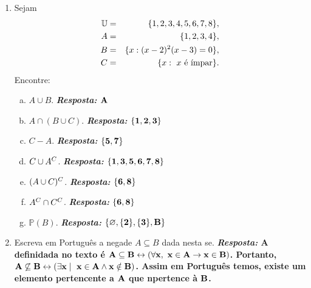 \begin{enumerate}[{\bf 1.}]
\item Sejam
\begin{eqnarray*}
\mathbb{U}&=&\{1,2,3,4,5,6,7,8\},\\
A&=&\{1,2,3,4\},\\
B&=&\{x:(x-2)^2(x-3)=0\},\\
C&=&\{x:\espaco x \textrm{ \'e \ih mpar}\}.
\end{eqnarray*}
Encontre:
\begin{enumerate}[a)]
\item $A\cup B$. {\bf{\it Resposta:} ${\bf A}$}
\item $A\cap(B\cup C)$. {\bf{\it Resposta:} ${\bf \{1,2,3\}}$}
\item $C-A$. {\bf{\it Resposta:} ${\bf \{5,7\}}$}
\item $C\cup A^C$. {\bf{\it Resposta:} ${\bf \{1,3,5,6,7,8\}}$}
\item $(A\cup C)^C$. {\bf{\it Resposta:} ${\bf \{6,8\}}$}
\item $A^C\cap C^C$. {\bf{\it Resposta:} ${\bf \{6,8\}}$}
\item $\mathbb{P}(B)$. {\bf{\it Resposta:} ${\bf \{\varnothing,\{2\},\{3\},B\}}$}
\end{enumerate}

\item Escreva em Portugu\^es a nega\cao de $A\subseteq B$ dada nesta se\caoi.
{\bf{\it Resposta:} A defini\cao dada no texto \'e ${\bf A \subseteq B \leftrightarrow (\forall x,\textrm{ } x\in A \to x\in B)}$. Portanto, ${\bf A \not\subseteq B \leftrightarrow (\exists x \mid  \textrm{ } x\in A \wedge x\notin B)}$. Assim em Portugu\^es temos, existe um elemento pertencente a ${\bf A}$ que n\ao pertence \`a ${\bf B}$.}


\end{enumerate}
